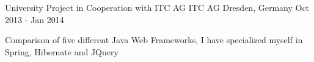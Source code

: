 \begin{cventries}
	\cventry
	{University Project in Cooperation with ITC AG} %
	{ITC AG} %
	{Dresden, Germany} %
	{Oct 2013 - Jan 2014} %
	{
		\begin{cvitems} %
			\item {Comparison of five different Java Web Frameworks, I have specialized myself in Spring, Hibernate and JQuery}
		\end{cvitems}
	}

\end{cventries}